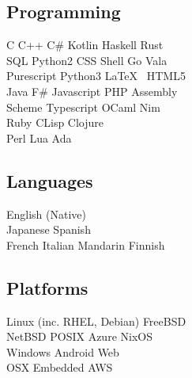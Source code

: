\documentclass[a4paper]{cv}
\begin{document}
\begin{minipage}[t]{0.33\textwidth}
		\subsection{Programming}
		
		C \textbullet{} C++ \textbullet{} C\# \textbullet{} Kotlin \textbullet{} Haskell \textbullet{} Rust \\
		SQL \textbullet{} Python2 \textbullet{} CSS \textbullet{} Shell \textbullet{} Go \textbullet{} Vala \\
		Purescript \textbullet{} Python3 \textbullet{} \LaTeX\ \textbullet{} {\small HTML5} \\\vspace{4pt}
		Java \textbullet{} F\# \textbullet{} Javascript \textbullet{} PHP \textbullet{} Assembly \\
		Scheme \textbullet{} Typescript \textbullet{} OCaml \textbullet{} Nim \\\vspace{4pt}
		Ruby \textbullet{} CLisp \textbullet{} Clojure \\
		Perl \textbullet{} Lua \textbullet{} Ada
		
		\sectionspace %
		
		\subsection{Languages}
		English (Native) \\\vspace{4pt}
		Japanese \textbullet{} Spanish \\\vspace{4pt}
		French \textbullet{} Italian \textbullet{} Mandarin \textbullet{} Finnish
		
		\sectionspace %
		
		\subsection{Platforms}
		Linux (inc. RHEL, Debian) \textbullet{} FreeBSD \\
		NetBSD \textbullet{} POSIX \textbullet{} Azure \textbullet{} NixOS \\\vspace{4pt}
		Windows \textbullet{} Android \textbullet{} Web \\\vspace{4pt}
		OSX \textbullet{} Embedded \textbullet{} AWS
		
		
	\end{minipage} %
\end{document}
